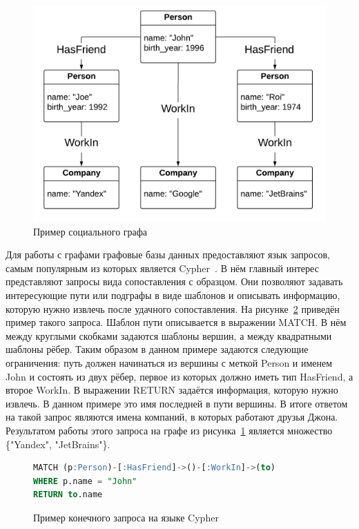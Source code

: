 \documentclass[14pt]{matmex-diploma-custom}
\begin{document}
\begin{figure}[h]
\centering
    \includegraphics[width=0.7\linewidth]{pictures/graph_bd_1.png}
    \caption{Пример социального графа}
    \label{fig:graph_bd_1}
\end{figure}

Для работы с графами графовые базы данных предоставляют язык запросов, самым популярным из которых является Cypher~\cite{cypher-language}. В нём главный интерес представляют запросы вида сопоставления с образцом. Они позволяют задавать интересующие пути или подграфы в виде шаблонов и описывать информацию, которую нужно извлечь после удачного сопоставления. На рисунке~\ref{code:cypher_query} приведён пример такого запроса. Шаблон пути описывается в выражении MATCH. В нём между круглыми скобками задаются шаблоны вершин, а между квадратными шаблоны рёбер. Таким образом в данном примере задаются следующие ограничения: путь должен начинаться из вершины с меткой Person и именем John и состоять из двух рёбер, первое из которых должно иметь тип HasFriend, а второе WorkIn. В выражении RETURN задаётся информация, которую нужно извлечь. В данном примере это имя последней в пути вершины. В итоге ответом на такой запрос являются имена компаний, в которых работают друзья Джона. Результатом работы этого запроса на графе из рисунка~\ref{fig:graph_bd_1} является множество \{"Yandex", "JetBrains"\}.


\begin{figure}[h]
\begin{lstlisting}[language=sql]
MATCH (p:Person)-[:HasFriend]->()-[:WorkIn]->(to)
WHERE p.name = "John"
RETURN to.name
\end{lstlisting}
\caption{Пример конечного запроса на языке Cypher}
\label{code:cypher_query}
\end{figure}
\end{document}

